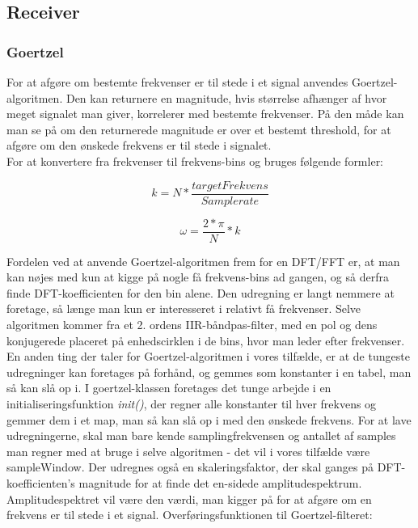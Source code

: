 \subsection{Receiver}

\subsubsection{Goertzel}

For at afgøre om bestemte frekvenser er til stede i et signal anvendes Goertzel-algoritmen. Den kan returnere en magnitude, hvis størrelse afhænger af hvor meget signalet man giver, korrelerer med bestemte frekvenser. På den måde kan man se på om den returnerede magnitude er over et bestemt threshold, for at afgøre om den ønskede frekvens er til stede i signalet.\\

For at konvertere fra frekvenser til frekvens-bins og  bruges følgende formler:

\noindent\begin{minipage}{.5\linewidth}
\begin{equation}
  k=N*\dfrac{targetFrekvens}{Samplerate}
\end{equation}
\end{minipage}%
\begin{minipage}{.5\linewidth}
\begin{equation}
  \omega = \dfrac{2*\pi}{N}*k
\end{equation}
\end{minipage}


Fordelen ved at anvende Goertzel-algoritmen frem for en DFT/FFT er, at man kan nøjes med kun at kigge på nogle få frekvens-bins ad gangen, og så derfra finde DFT-koefficienten for den bin alene. Den udregning er langt nemmere at foretage, så længe man kun er interesseret i relativt få frekvenser. Selve algoritmen kommer fra et 2. ordens IIR-båndpas-filter, med en pol og dens konjugerede placeret på enhedscirklen i de bins, hvor man leder efter frekvenser. En anden ting der taler for Goertzel-algoritmen i vores tilfælde, er at de tungeste udregninger kan foretages på forhånd, og gemmes som konstanter i en tabel, man så kan slå op i. I goertzel-klassen foretages det tunge arbejde i en initialiseringsfunktion \textit{init()}, der regner alle konstanter til hver frekvens og gemmer dem i et map, man så kan slå op i med den ønskede frekvens. For at lave udregningerne, skal man bare kende samplingfrekvensen og antallet af samples man regner med at bruge i selve algoritmen - det vil i vores tilfælde være sampleWindow. Der udregnes også en skaleringsfaktor, der skal ganges på DFT-koefficienten's magnitude for at finde det en-sidede amplitudespektrum. Amplitudespektret vil være den værdi, man kigger på for at afgøre om en frekvens er til stede i et signal. 
Overføringsfunktionen til Goertzel-filteret:



